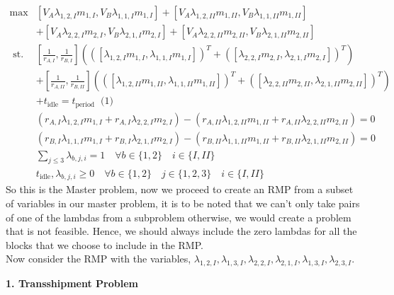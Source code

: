 \documentclass[11pt]{article}
\begin{document}
\noindent $\begin{aligned} 
    \max & [V_A \lambda_{1,2,I} m_{1,I}, V_B \lambda_{1,1,I} m_{1,I}] + [V_A \lambda_{1,2,II} m_{1,II}, V_B \lambda_{1,1,II} m_{1,II}] \\
    &+ [V_A \lambda_{2,2,I} m_{2,I}, V_B \lambda_{2,1,I} m_{2,I}] + [V_A \lambda_{2,2,II} m_{2,II}, V_B \lambda_{2,1,II} m_{2,II}] \\ 
    \text { st. } & [\frac{1}{r_{A,I}}, \frac{1}{r_{B,I}}](([\lambda_{1,2,I} m_{1,I},  \lambda_{1,1,I} m_{1,I}])^T + ([\lambda_{2,2,I} m_{2,I}, \lambda_{2,1,I} m_{2,I}] )^T)\\
    & + [\frac{1}{r_{A,II}}, \frac{1}{r_{B,II}}](([\lambda_{1,2,II} m_{1,II}, \lambda_{1,1,II} m_{1,II}])^T + ([\lambda_{2,2,II} m_{2,II}, \lambda_{2,1,II} m_{2,II}])^T) \\
    &+ t_{\text{idle}} = t_{\text {period }} \text { (1) } \\ 
    & (r_{A,I} \lambda_{1,2,I} m_{1,I} + r_{A,I} \lambda_{2,2,I} m_{2,I}) - (r_{A,II} \lambda_{1,2,II} m_{1,II} + r_{A,II} \lambda_{2,2,II} m_{2,II}) = 0\\
    & (r_{B,I} \lambda_{1,1,I} m_{1,I} + r_{B,I} \lambda_{2,1,I} m_{2,I}) - (r_{B,II} \lambda_{1,1,II} m_{1,II} + r_{B,II} \lambda_{2,1,II} m_{2,II}) = 0\\
    & \sum_{j \leq 3} \lambda_{b,j,i} = 1 \quad \forall b \in \{1,2\} \quad i \in \{I,II\} \\
    & t_{\text{idle}}, \lambda_{b,j,i} \geq 0 \quad \forall b \in \{1,2\} \quad j \in \{1,2,3\} \quad i \in \{I,II\} 
\end{aligned}$\\

\noindent So this is the Master problem, now we proceed to create an RMP from a subset of variables in our master problem, it is to be noted that we can't only take pairs of one of the lambdas from a subproblem otherwise, we would create a problem that is not feasible. Hence, we should always include the zero lambdas for all the blocks that we choose to include in the RMP.
\\

\noindent Now consider the RMP with the variables, $\lambda_{1,2,I}, \lambda_{1,3,I}, \lambda_{2,2,I}, \lambda_{2,1,I}, \lambda_{1,3,I}, \lambda_{2,3,I} $.



\noindent \textbf{\large{1. Transshipment Problem}} \\
\end{document}

